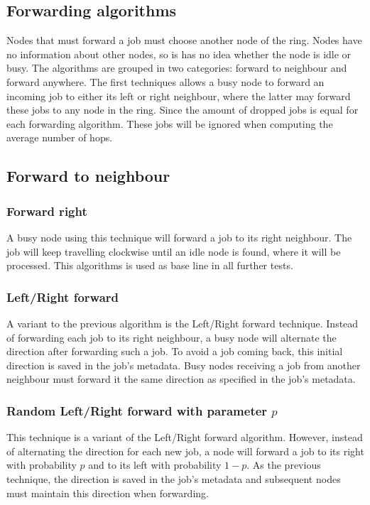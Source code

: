 \documentclass[10pt,a4paper,titlepage]{article}
\begin{document}
\subsection{Forwarding algorithms}
Nodes that must forward a job must choose another node of the ring. Nodes have no information about other nodes, so is has no idea whether the node is idle or busy. The algorithms are grouped in two categories: forward to neighbour and forward anywhere.
The first techniques allows a busy node to forward an incoming job to either its left or right neighbour, where the latter may forward these jobs to any node in the ring. 
Since the amount of dropped jobs is equal for each forwarding algorithm. These jobs will be ignored when computing the average number of hops.


\subsection{Forward to neighbour}
\subsubsection{Forward right}
A busy node using this technique will forward a job to its right neighbour. The job will keep travelling clockwise until an idle node is found, where it will be processed. This algorithms is used as base line in all further tests.

\subsubsection{Left/Right forward}
A variant to the previous algorithm is the Left/Right forward technique. Instead of forwarding each job to its right neighbour, a busy node will alternate the direction after forwarding such a job. To avoid a job coming back, this initial direction is saved in the job's metadata. Busy nodes receiving a job from another neighbour must forward it the same direction as specified in the job's metadata.

\subsubsection{Random Left/Right forward with parameter $p$}
This technique is a variant of the Left/Right forward algorithm. However, instead of alternating the direction for each new job, a node will forward a job to its right with probability $p$ and to its left with probability $1-p$. As the previous technique, the direction is saved in the job's metadata and subsequent nodes must maintain this direction when forwarding.
\end{document}
